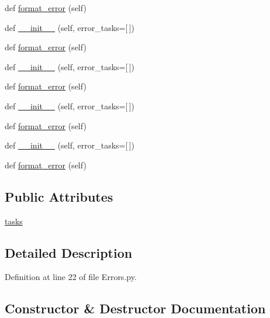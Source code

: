\begin{DoxyCompactItemize}
\item 
def \hyperlink{classwaflib_1_1_errors_1_1_build_error_a086f7248444a2068a4df7a73a2450968}{format\+\_\+error} (self)
\item 
def \hyperlink{classwaflib_1_1_errors_1_1_build_error_aa294780921c40c9f8e6aa7ec10a19d30}{\+\_\+\+\_\+init\+\_\+\+\_\+} (self, error\+\_\+tasks=\mbox{[}$\,$\mbox{]})
\item 
def \hyperlink{classwaflib_1_1_errors_1_1_build_error_a086f7248444a2068a4df7a73a2450968}{format\+\_\+error} (self)
\item 
def \hyperlink{classwaflib_1_1_errors_1_1_build_error_aa294780921c40c9f8e6aa7ec10a19d30}{\+\_\+\+\_\+init\+\_\+\+\_\+} (self, error\+\_\+tasks=\mbox{[}$\,$\mbox{]})
\item 
def \hyperlink{classwaflib_1_1_errors_1_1_build_error_a086f7248444a2068a4df7a73a2450968}{format\+\_\+error} (self)
\item 
def \hyperlink{classwaflib_1_1_errors_1_1_build_error_aa294780921c40c9f8e6aa7ec10a19d30}{\+\_\+\+\_\+init\+\_\+\+\_\+} (self, error\+\_\+tasks=\mbox{[}$\,$\mbox{]})
\item 
def \hyperlink{classwaflib_1_1_errors_1_1_build_error_a086f7248444a2068a4df7a73a2450968}{format\+\_\+error} (self)
\item 
def \hyperlink{classwaflib_1_1_errors_1_1_build_error_aa294780921c40c9f8e6aa7ec10a19d30}{\+\_\+\+\_\+init\+\_\+\+\_\+} (self, error\+\_\+tasks=\mbox{[}$\,$\mbox{]})
\item 
def \hyperlink{classwaflib_1_1_errors_1_1_build_error_a086f7248444a2068a4df7a73a2450968}{format\+\_\+error} (self)
\end{DoxyCompactItemize}
\subsection*{Public Attributes}
\begin{DoxyCompactItemize}
\item 
\hyperlink{classwaflib_1_1_errors_1_1_build_error_aa1bd7604d6ce50108307cdbd0d228211}{tasks}
\end{DoxyCompactItemize}


\subsection{Detailed Description}


Definition at line 22 of file Errors.\+py.



\subsection{Constructor \& Destructor Documentation}
